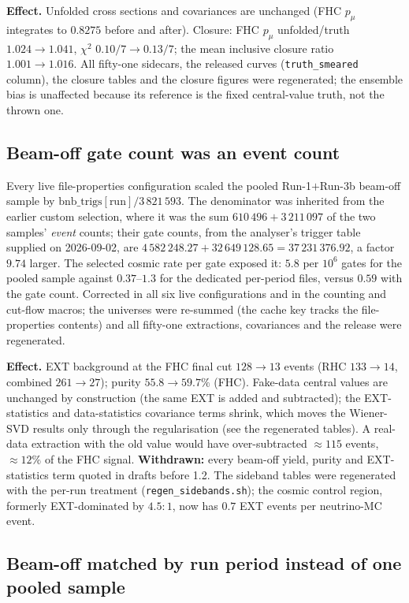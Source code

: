\textbf{Effect.}  Unfolded cross sections and covariances are unchanged (FHC $p_\mu$
integrates to $0.8275$ before and after).  Closure: FHC $p_\mu$ unfolded/truth
$1.024\to1.041$, $\chi^2$ $0.10/7\to0.13/7$; the mean inclusive closure ratio
$1.001\to1.016$.  All fifty-one sidecars, the released curves
(\texttt{truth\_smeared} column), the closure tables and the closure figures were
regenerated; the ensemble bias is unaffected because its reference is the fixed
central-value truth, not the thrown one.

\subsection{Beam-off gate count was an event count}

Every live file-properties configuration scaled the pooled Run-1$+$Run-3b beam-off
sample by $\text{bnb\_trigs}[\text{run}]/3\,821\,593$.  The denominator was inherited from
the earlier custom selection, where it was the sum $610\,496+3\,211\,097$ of the two
samples' \emph{event} counts; their gate counts, from the analyser's trigger table
supplied on 2026-09-02, are $4\,582\,248.27+32\,649\,128.65=37\,231\,376.92$, a factor
$9.74$ larger.  The selected cosmic rate per gate exposed it: $5.8$ per $10^{6}$ gates for
the pooled sample against $0.37$--$1.3$ for the dedicated per-period files, versus $0.59$
with the gate count.  Corrected in all six live configurations and in the counting and
cut-flow macros; the universes were re-summed (the cache key tracks the file-properties
contents) and all fifty-one extractions, covariances and the release were regenerated.

\textbf{Effect.}  EXT background at the FHC final cut $128\to13$ events (RHC
$133\to14$, combined $261\to27$); purity $55.8\to59.7\%$ (FHC).  Fake-data central values
are unchanged by construction (the same EXT is added and subtracted); the EXT-statistics
and data-statistics covariance terms shrink, which moves the Wiener-SVD results only
through the regularisation (see the regenerated tables).  A real-data extraction with the
old value would have over-subtracted $\approx\!115$ events, $\approx\!12\%$ of the FHC
signal.  \textbf{Withdrawn:} every beam-off yield, purity and EXT-statistics term quoted
in drafts before 1.2.  The sideband tables were regenerated with the per-run treatment
(\texttt{regen\_sidebands.sh}); the cosmic control region, formerly EXT-dominated by
$4.5:1$, now has $0.7$ EXT events per neutrino-MC event.

\subsection{Beam-off matched by run period instead of one pooled sample}

